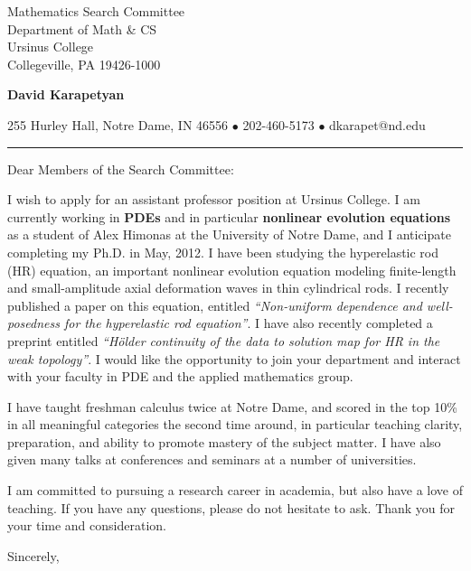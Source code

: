 \documentclass[12pt]{letter}
\date{\vspace{0.5cm}\flushleft \today}
\begin{document}
\begin{letter}{Mathematics Search Committee \\
Department of Math \& CS \\
Ursinus College \\
Collegeville, PA 19426-1000
}
    \begin{center}
{\bf {\Large David Karapetyan}}
\end{center}

\begin{center}
{255 Hurley Hall, Notre Dame, IN 46556  $\bullet$
202-460-5173 $\bullet$ dkarapet@nd.edu
}
\end{center}
\hrule

\opening{Dear Members of the Search Committee:\\}
%
%
I wish to apply for an assistant professor position at
Ursinus College. I am currently working in \textbf{PDEs} and in particular \textbf{nonlinear evolution equations} as a student of Alex Himonas at the
University of Notre Dame, and I anticipate completing my Ph.D.
in May, 2012. I have been studying the hyperelastic rod (HR) equation, an important nonlinear
evolution equation modeling finite-length and small-amplitude axial deformation
waves in thin cylindrical rods. I recently published a paper on this equation,
entitled {\it ``Non-uniform dependence and well-posedness for the hyperelastic
rod equation''}. I have also recently completed a preprint entitled {\it
  ``H\"older continuity of the data to solution map for HR in the weak
topology''}. I would like the opportunity to join your department and interact
with your faculty in PDE and the applied mathematics group. 

I have taught freshman calculus twice at Notre Dame, and scored in the top 10\%
in all meaningful categories the second time around, in particular teaching
clarity, preparation, and ability to promote mastery of the subject matter. I
have also given many talks at conferences and seminars at a number of
universities. 

I am committed to pursuing a research career in academia, but also have a love
of teaching. If you have any questions, please do not hesitate to ask. Thank you for your time and consideration. 

\closing{Sincerely,}


\end{letter}
\end{document}

